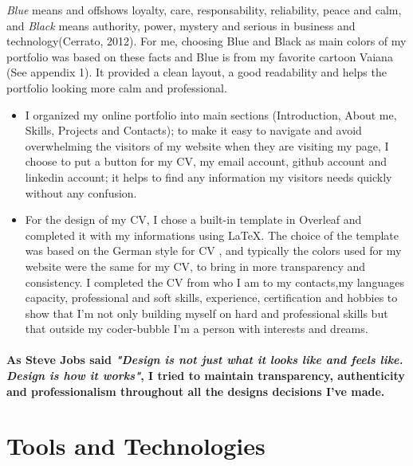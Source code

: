 \documentclass[12pt]{article}
\begin{document}
{ \textit{Blue} means and offshows loyalty, care, responsability, reliability, peace and calm, and \textit{Black} means authority, power, mystery and serious in business and technology(Cerrato, 2012). For me, choosing Blue and Black as main colors of my portfolio was based on these facts and Blue is from my favorite cartoon Vaiana (See appendix 1). It provided a clean layout, a good readability and helps the portfolio looking more calm and professional.} 


\begin{itemize}
    

\item {I organized my online portfolio into main sections (Introduction, About me, Skills, Projects and Contacts); to make it  easy to navigate and avoid overwhelming the visitors of my website when they are visiting my page, I choose to put a button for my CV, my email account, github account and linkedin account; it helps to find any information my visitors needs quickly without any confusion.}

\item {For the design of my CV, I chose a built-in template in Overleaf and completed it with my informations using La\TeX{}. The choice of the template was based on the German style for CV , and typically the colors used for my website were the same for my CV, to bring in more transparency and consistency. I completed the CV from who I am to my contacts,my languages capacity, professional and soft skills, experience, certification and hobbies to show that I'm not only building myself on hard and professional skills but that outside my coder-bubble I'm a person with interests and dreams.}


\end{itemize}
\paragraph{As Steve Jobs said \textit{"Design is not just what it looks like and feels like. Design is how it works"}, I tried to maintain transparency, authenticity and professionalism throughout all the designs decisions I've made.}








\newpage

\section{Tools and Technologies}
\end{document}
